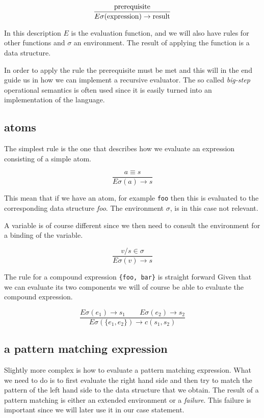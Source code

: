 \documentclass[a4paper,11pt]{article}
\begin{document}
$$\frac{{\rm prerequisite}}{E\sigma({\rm expression}) \rightarrow {\rm result}}$$

In this description $E$ is the evaluation function, and we will also
have rules for other functions and $\sigma$ an environment. The result
of applying the function is a data structure.

In order to apply the rule the prerequisite must be met and this will
in the end guide us in how we can implement a recursive evaluator. The
so called {\em big-step} operational semantics is often used since it
is easily turned into an implementation of the language.

\subsection{atoms}

The simplest rule is the one that describes how we evaluate an
expression consisting of a simple atom.

$$\frac{a \equiv s}{E\sigma(a) \rightarrow s}$$  

This mean that if we have an atom, for example {\tt foo} then this is
evaluated to the corresponding data structure {\em foo}. The
environment $\sigma$, is in this case not relevant. 

A variable is of course different since we then need to consult the
environment for a binding of the variable.

   $$\frac{v/s \in \sigma}{E\sigma(v) \rightarrow s}$$

The rule for a compound expression {\tt \{foo, bar\}} is straight
forward Given that we can evaluate its two components we will of
course be able to evaluate the compound expression.

$$\frac{ E\sigma(e_1) \rightarrow s_1 \qquad   E\sigma(e_2) \rightarrow s_2}{E\sigma(\lbrace e_1 , e_2\rbrace) \rightarrow c(s_1, s_2)}$$

\subsection{a pattern matching expression}

Slightly more complex is how to evaluate a pattern matching
expression. What we need to do is to first evaluate the right hand
side and then try to match the pattern of the left hand side to the
data structure that we obtain. The result of a pattern matching is
either an extended environment or a {\em failure}. This failure is
important since we will later use it in our case statement.
\end{document}
